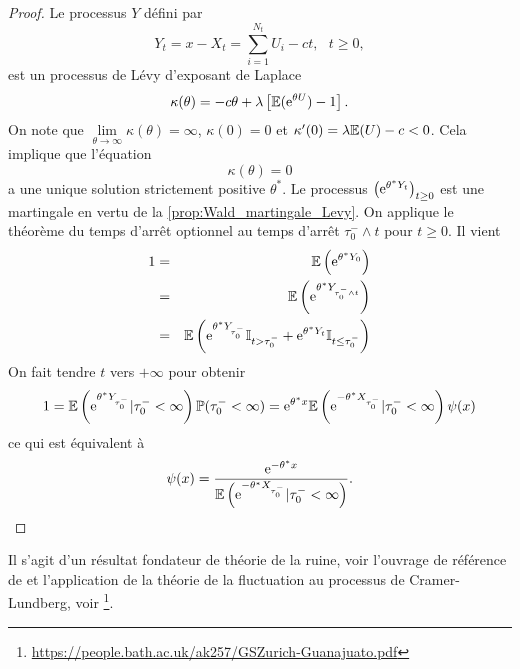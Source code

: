 \begin{proof}
Le processus $Y$ défini par
$$
Y_t = x - X_t = \sum_{i=1}^{N_t}U_i - ct,\text{ }t\geq 0,
$$
est un processus de Lévy d'exposant de Laplace 
$$
\kappa(\theta) = -c\theta+\lambda\left[\mathbb{E}(\mathrm{e}^{\theta U})-1\right].
$$
On note que $\underset{\theta\rightarrow \infty}{\lim}\kappa(\theta) = \infty$, $\kappa(0) = 0$ et $\kappa'(0) = \lambda\mathbb{E}(U)-c<0$. Cela implique que l'équation 
$$
\kappa(\theta)=0
$$
a une unique solution strictement positive $\theta^\ast$. Le processus $\left(\mathrm{e}^{\theta^\ast Y_t}\right)_{t\geq 0}$ est une martingale en vertu de la \cref{prop:Wald_martingale_Levy}. On applique le théorème du temps d'arrêt optionnel au temps d'arrêt $\tau_0^-\land t$ pour $t\geq 0$. Il vient 
\begin{eqnarray*}
1&=&\mathbb{E}\left(\mathrm{e}^{\theta^\ast Y_0}\right)\\
&=&\mathbb{E}\left(\mathrm{e}^{\theta^\ast Y_{\tau_0^-\land t}}\right)\\
&=&\mathbb{E}\left(\mathrm{e}^{\theta^\ast Y_{\tau_0^-}}\mathbb{I}_{t>\tau_0^-}+\mathrm{e}^{\theta^\ast Y_{t}}\mathbb{I}_{t\leq \tau_0^-}\right)\\
\end{eqnarray*}
On fait tendre $t$ vers $+\infty$ pour obtenir
$$
1 = \mathbb{E}\left(\mathrm{e}^{\theta^\ast Y_{\tau_0^-}}|\tau_0^-<\infty\right)\mathbb{P}(\tau_0^-<\infty)=\mathrm{e}^{\theta^\ast x}\mathbb{E}\left(\mathrm{e}^{-\theta^\ast X_{\tau_0^-}}|\tau_0^-<\infty\right)\psi(x)
$$
ce qui est équivalent à 
$$
\psi(x)=\frac{\mathrm{e}^{-\theta^\ast x}}{\mathbb{E}\left(\mathrm{e}^{-\theta^\ast X_{\tau_0^-}}|\tau_0^-<\infty\right)}.
$$

\end{proof}
Il s'agit d'un résultat fondateur de théorie de la ruine, voir l'ouvrage de référence de \citet{Asmussen2010} et l'application de la théorie de la fluctuation au processus de Cramer-Lundberg, voir \citet{Kyprianou2013}\footnote{\url{https://people.bath.ac.uk/ak257/GSZurich-Guanajuato.pdf}}. 
\newpage